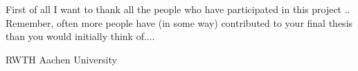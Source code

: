\documentclass[a4paper,11pt]{MScThesis}
\begin{document}

    \cleardoublepage
%
    First of all I want to thank all the people who have participated in this project ..
    Remember, often more people have (in some way) contributed to your final thesis than you would initially think of....
    \vspace*{15mm}

    \noindent 
    RWTH Aachen University \hfill \mscname\\ %
    \mscdate

%
    \tocloflot
%
%
    \begin{acronym}%
    \end{acronym}%
    \cleardoublepage%
%
%
%
\mainmatter
%
\end{document}
